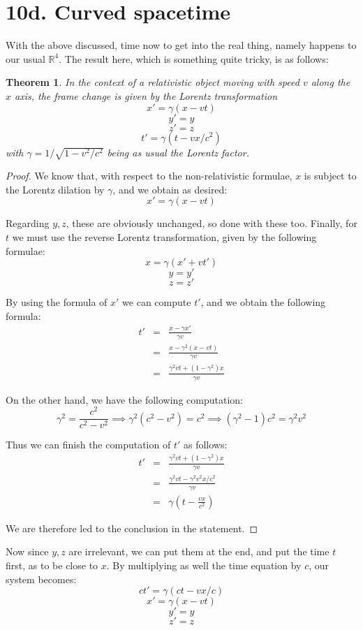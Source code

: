 \documentclass[12pt]{amsbook}
\newtheorem{theorem}{Theorem}[chapter]
\begin{document}
\section*{10d. Curved spacetime}

With the above discussed, time now to get into the real thing, namely happens to our usual $\mathbb R^4$. The result here, which is something quite tricky, is as follows:

\begin{theorem}
In the context of a relativistic object moving with speed $v$ along the $x$ axis, the frame change is given by the Lorentz transformation
$$x'=\gamma(x-vt)$$
$$y'=y$$
$$z'=z$$
$$t'=\gamma(t-vx/c^2)$$
with $\gamma=1/\sqrt{1-v^2/c^2}$ being as usual the Lorentz factor.
\end{theorem}

\begin{proof}
We know that, with respect to the non-relativistic formulae, $x$ is subject to the Lorentz dilation by $\gamma$, and we obtain as desired:
$$x'=\gamma(x-vt)$$

Regarding $y,z$, these are obviously unchanged, so done with these too. Finally, for $t$ we must use the reverse Lorentz transformation, given by the following formulae:
$$x=\gamma(x'+vt')$$
$$y=y'$$
$$z=z'$$

By using the formula of $x'$ we can compute $t'$, and we obtain the following formula:
\begin{eqnarray*}
t'
&=&\frac{x-\gamma x'}{\gamma v}\\
&=&\frac{x-\gamma^2(x-vt)}{\gamma v}\\
&=&\frac{\gamma^2vt+(1-\gamma^2)x}{\gamma v}
\end{eqnarray*}

On the other hand, we have the following computation:
$$\gamma^2=\frac{c^2}{c^2-v^2}
\implies\gamma^2(c^2-v^2)=c^2
\implies(\gamma^2-1)c^2=\gamma^2v^2$$

Thus we can finish the computation of $t'$ as follows:
\begin{eqnarray*}
t'
&=&\frac{\gamma^2vt+(1-\gamma^2)x}{\gamma v}\\
&=&\frac{\gamma^2vt-\gamma^2v^2x/c^2}{\gamma v}\\
&=&\gamma\left(t-\frac{vx}{c^2}\right)
\end{eqnarray*}

We are therefore led to the conclusion in the statement.
\end{proof}

Now since $y,z$ are irrelevant, we can put them at the end, and put the time $t$ first, as to be close to $x$. By multiplying as well the time equation by $c$, our system becomes:
$$ct'=\gamma(ct-vx/c)$$
$$x'=\gamma(x-vt)$$
$$y'=y$$
$$z'=z$$
\end{document}

